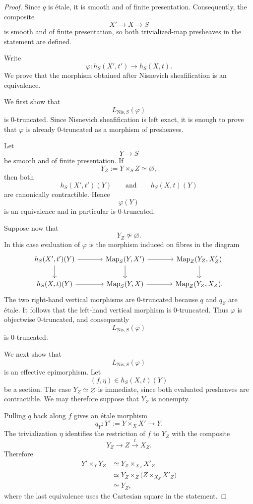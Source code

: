 \begin{proof}
Since \(q\) is étale, it is smooth and of finite presentation.
Consequently, the composite
\[
    X'
    \longrightarrow
    X
    \longrightarrow
    S
\]
is smooth and of finite presentation, so both trivialized-map
presheaves in the statement are defined.

Write
\[
    \varphi
    \colon
    h_S(X',t')
    \longrightarrow
    h_S(X,t).
\]
We prove that the morphism obtained after Nisnevich sheafification is
an equivalence.

We first show that
\[
    L_{\mathrm{Nis},S}(\varphi)
\]
is \(0\)-truncated.  Since Nisnevich sheafification is left exact, it
is enough to prove that \(\varphi\) is already \(0\)-truncated as a
morphism of presheaves.

Let
\[
    Y
    \longrightarrow
    S
\]
be smooth and of finite presentation.  If
\[
    Y_Z
    :=
    Y\times_SZ
    \simeq
    \varnothing,
\]
then both
\[
    h_S(X',t')(Y)
    \qquad\text{and}\qquad
    h_S(X,t)(Y)
\]
are canonically contractible.  Hence
\[
    \varphi(Y)
\]
is an equivalence and in particular is \(0\)-truncated.

Suppose now that
\[
    Y_Z
    \not\simeq
    \varnothing.
\]
In this case evaluation of \(\varphi\) is the morphism induced on
fibres in the diagram
\[
\begin{tikzcd}[column sep=large]
    h_S(X',t')(Y)
        \arrow[r]
        \arrow[d]
    &
    \operatorname{Map}_S(Y,X')
        \arrow[r]
        \arrow[d]
    &
    \operatorname{Map}_Z(Y_Z,X'_Z)
        \arrow[d]
    \\
    h_S(X,t)(Y)
        \arrow[r]
    &
    \operatorname{Map}_S(Y,X)
        \arrow[r]
    &
    \operatorname{Map}_Z(Y_Z,X_Z).
\end{tikzcd}
\]
The two right-hand vertical morphisms are \(0\)-truncated because
\(q\) and \(q_Z\) are étale.  It follows that the left-hand vertical
morphism is \(0\)-truncated.  Thus \(\varphi\) is objectwise
\(0\)-truncated, and consequently
\[
    L_{\mathrm{Nis},S}(\varphi)
\]
is \(0\)-truncated.

We next show that
\[
    L_{\mathrm{Nis},S}(\varphi)
\]
is an effective epimorphism.  Let
\[
    (f,\eta)
    \in
    h_S(X,t)(Y)
\]
be a section.  The case \(Y_Z\simeq\varnothing\) is immediate, since
both evaluated presheaves are contractible.  We may therefore suppose
that \(Y_Z\) is nonempty.

Pulling \(q\) back along \(f\) gives an étale morphism
\[
    q_Y
    \colon
    Y'
    :=
    Y\times_XX'
    \longrightarrow
    Y.
\]
The trivialization \(\eta\) identifies the restriction of \(f\) to
\(Y_Z\) with the composite
\[
    Y_Z
    \longrightarrow
    Z
    \xrightarrow{t}
    X_Z.
\]
Therefore
\[
\begin{aligned}
    Y'\times_YY_Z
    &\simeq
    Y_Z\times_{X_Z}X'_Z
    \\
    &\simeq
    Y_Z\times_Z
    \bigl(
        Z\times_{X_Z}X'_Z
    \bigr)
    \\
    &\simeq
    Y_Z,
\end{aligned}
\]
where the last equivalence uses the Cartesian square in the
statement.


\end{proof}
